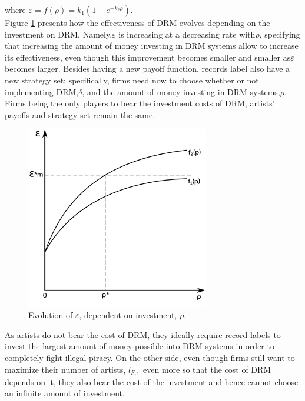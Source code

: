 \documentclass[letter,12pt]{article}
\numberwithin{equation}{section}
\begin{document}
where $\varepsilon=f(\rho)=k_{1}(1-e^{-k_{2}\rho})$.\\

Figure \ref{Fig:EpsilonEvolution} presents how the effectiveness of DRM evolves depending on
the investment on DRM. Namely,$\varepsilon$ is increasing at a decreasing
rate with$\rho$, specifying that increasing the amount of money investing
in DRM systems allow to increase its effectiveness, even though this
improvement becomes smaller and smaller as$\varepsilon$ becomes larger.
Besides having a new payoff function, records label also have a new
strategy set; specifically, firms need now to choose whether or not
implementing DRM,$\delta$, and the amount of money investing in DRM
systems,$\rho$. Firms being the only players to bear the investment
costs of DRM, artists' payoffs and strategy set remain the same.\\

\begin{figure}[h!]
\centering
\includegraphics[width=8cm]{Graphics/graph1.pdf}
\caption{Evolution of $\varepsilon$, dependent on investment, $\rho$.}
\label{Fig:EpsilonEvolution}
\end{figure}

As artists do not bear the cost of DRM, they ideally require record
labels to invest the largest amount of money possible into DRM systems
in order to completely fight illegal piracy. On the other side, even
though firms still want to maximize their number of artists, $l_{F_{i}},$
even more so that the cost of DRM depends on it, they also bear the
cost of the investment and hence cannot choose an infinite amount
of investment.\\
\end{document}

